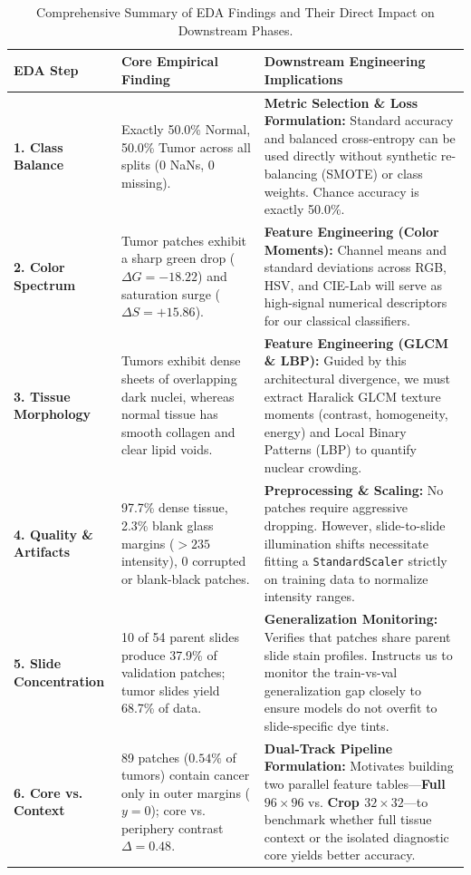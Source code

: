 \documentclass[11pt,a4paper]{article}
\begin{document}
\begin{table}[H]
\centering
\small
\caption{Comprehensive Summary of EDA Findings and Their Direct Impact on Downstream Phases.}
\label{tab:eda_summary}
\begin{tabular}{@{}p{}@{\hspace{10pt}}p{}@{\hspace{10pt}}p{}@{}}
\toprule
\textbf{EDA Step} & \textbf{Core Empirical Finding} & \textbf{Downstream Engineering Implications} \\
\midrule
\textbf{1. Class Balance} & Exactly 50.0\% Normal, 50.0\% Tumor across all splits (0 NaNs, 0 missing). & \textbf{Metric Selection \& Loss Formulation:} Standard accuracy and balanced cross-entropy can be used directly without synthetic re-balancing (SMOTE) or class weights. Chance accuracy is exactly 50.0\%. \\
\midrule
\textbf{2. Color Spectrum} & Tumor patches exhibit a sharp green drop ($\Delta G = -18.22$) and saturation surge ($\Delta S = +15.86$). & \textbf{Feature Engineering (Color Moments):} Channel means and standard deviations across RGB, HSV, and CIE-Lab will serve as high-signal numerical descriptors for our classical classifiers. \\
\midrule
\textbf{3. Tissue Morphology} & Tumors exhibit dense sheets of overlapping dark nuclei, whereas normal tissue has smooth collagen and clear lipid voids. & \textbf{Feature Engineering (GLCM \& LBP):} Guided by this architectural divergence, we must extract Haralick GLCM texture moments (contrast, homogeneity, energy) and Local Binary Patterns (LBP) to quantify nuclear crowding. \\
\midrule
\textbf{4. Quality \& Artifacts} & 97.7\% dense tissue, 2.3\% blank glass margins ($> 235$ intensity), 0 corrupted or blank-black patches. & \textbf{Preprocessing \& Scaling:} No patches require aggressive dropping. However, slide-to-slide illumination shifts necessitate fitting a \texttt{StandardScaler} strictly on training data to normalize intensity ranges. \\
\midrule
\textbf{5. Slide Concentration} & 10 of 54 parent slides produce 37.9\% of validation patches; tumor slides yield 68.7\% of data. & \textbf{Generalization Monitoring:} Verifies that patches share parent slide stain profiles. Instructs us to monitor the train-vs-val generalization gap closely to ensure models do not overfit to slide-specific dye tints. \\
\midrule
\textbf{6. Core vs. Context} & 89 patches ($0.54\%$ of tumors) contain cancer only in outer margins ($y=0$); core vs. periphery contrast $\Delta = 0.48$. & \textbf{Dual-Track Pipeline Formulation:} Motivates building two parallel feature tables---\textbf{Full $96 \times 96$} vs. \textbf{Crop $32 \times 32$}---to benchmark whether full tissue context or the isolated diagnostic core yields better accuracy. \\
\bottomrule
\end{tabular}
\end{table}
\end{document}
